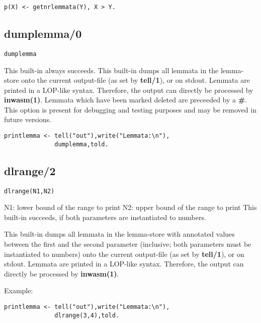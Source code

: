 \begin{enumerate}
\begin{verbatim}
p(X) <- getnrlemmata(Y), X > Y.
\end{verbatim}

\subsection{dumplemma/0}
{\tt dumplemma}

This built-in always succeeds.
This built-in dumps all lemmata in the lemma-store
onto the current output-file (as set by {\bf tell/1}), or on
stdout.
Lemmata are printed in a LOP-like syntax. Therefore, the output can directly
be processed by {\bf inwasm(1)}.
Lemmata which have been marked deleted are preceeded by a {\bf \#}.
This option is present for debugging and testing purposes and may
be removed in future versions.

\begin{verbatim}
printlemma <- tell("out"),write("Lemmata:\n"),
              dumplemma,told.
\end{verbatim}

\subsection{dlrange/2}

{\tt dlrange(N1,N2)}

N1: lower bound of the range to print
N2: upper bound of the range to print
This built-in succeeds, if both parameters are
instantiated to numbers.

This built-in dumps all lemmata in the lemma-store
with annotated values between the first and the second parameter
(inclusive; both parameters must be instantiated to numbers)
onto the current output-file (as set by {\bf tell/1}), or on
stdout.
Lemmata are printed in a LOP-like syntax. Therefore, the output can directly
be processed by {\bf inwasm(1)}.

Example:
\begin{verbatim}
printlemma <- tell("out"),write("Lemmata:\n"),
              dlrange(3,4),told.
\end{verbatim}


\end{enumerate}
